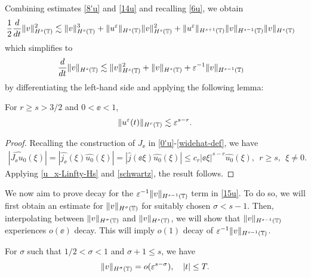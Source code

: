 %
%
Combining estimates \eqref{8'u} and \eqref{14u} and recalling
\eqref{6u}, we obtain
%
%
\begin{equation*}
\begin{split}
\frac{1}{2}\frac{d}{dt}\|v\|_{H^{s}(\mathbb{T})}^2
& \lesssim \|v\|_{H^s(\mathbb{T})}^3 + \|u^\varepsilon\|_{H^s(\mathbb{T})}
\|v\|_{H^s(\mathbb{T})}^2
 + \|u^\varepsilon\|_{H^{s+1}(\mathbb{T})}
\|v\|_{H^{s-1}(\mathbb{T})} \|v\|_{H^s(\mathbb{T})}
\end{split}
\end{equation*}
%
%
which simplifies to 
\begin{equation}
\begin{split}
\frac{d}{dt}\|v\|_{H^{s}(\mathbb{T})}
& \lesssim \|v\|_{H^s(\mathbb{T})}^2 + 
\|v\|_{H^s(\mathbb{T})}
+ \varepsilon^{-1}
\|v\|_{H^{s-1}(\mathbb{T})} 
\label{15u}
\end{split}
\end{equation}
by differentiating the left-hand side and applying the following lemma:
%
%
%
\begin{lemma}
\label{lem5r}
For $r \ge s > 3/2$ and $0 < \ee <1$, 
%
%
\begin{equation}
\begin{split}
\|u^{\varepsilon} (t) \|_{H^r(\mathbb{T})} \lesssim \varepsilon^{s-r}.
\label{700r}
\end{split}
\end{equation}
%
%
\end{lemma}
%
%
\begin{proof} Recalling the construction of $J_\ee$ in 
\eqref{0'u}-\eqref{widehat-def},  we have
%
%
\begin{equation}
\label{schwartz}
\begin{split}
	|\widehat{J_\ee u_0}(\xi)| = |\widehat{j_\ee}(\xi) \widehat{u_0}(\xi)|
	= |\widehat{j }(\ee \xi) \widehat{u_0}(\xi)| \le c_r |\ee \xi 
	|^{s-r} \widehat{u_0}(\xi), \ \ r \ge s, \ \ \xi \neq 0.
\end{split}
\end{equation}
%
%
Applying \eqref{u_x-Linfty-Hs} and \eqref{schwartz}, the result follows.
\end{proof}
%
%
%
We now aim to prove decay for the $\varepsilon^{-1}
\|v\|_{H^{s-1}(\mathbb{T})} $ term in \eqref{15u}. To do so, we 
will first obtain an estimate for
$\|v\|_{H^\sigma(\mathbb{T})}$ for suitably chosen $\sigma < s-1$. Then, 
interpolating between $\|v\|_{H^\sigma(\mathbb{T})}$
and $\|v\|_{H^s(\mathbb{T})}$, we will show that 
$\|v\|_{H^{s-1}(\mathbb{T})}$ experiences $o(\ee)$ decay. This will imply
$o(1)$ decay of $\varepsilon^{-1}
\|v\|_{H^{s-1}(\mathbb{T})} $.
%
%
\begin{proposition} \label{prop:6r}
For $\sigma$ such that $1/2 < \sigma < 1$ and $\sigma + 1 \le s$, we have
%
%
\begin{equation}
\begin{split}
\|v\|_{H^{\sigma}(\mathbb{T})} = o(\varepsilon^{s- \sigma }), \quad |t| \le T.
\end{split}
\end{equation}
%
%
\end{proposition}
